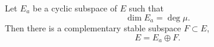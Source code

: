 Let $E_a$ be a cyclic subspace of $E$ such that
$$\dim E_a = \deg \mu.$$
Then there is a complementary stable subspace $F \subset E$,
$$E = E_a \oplus F.$$
